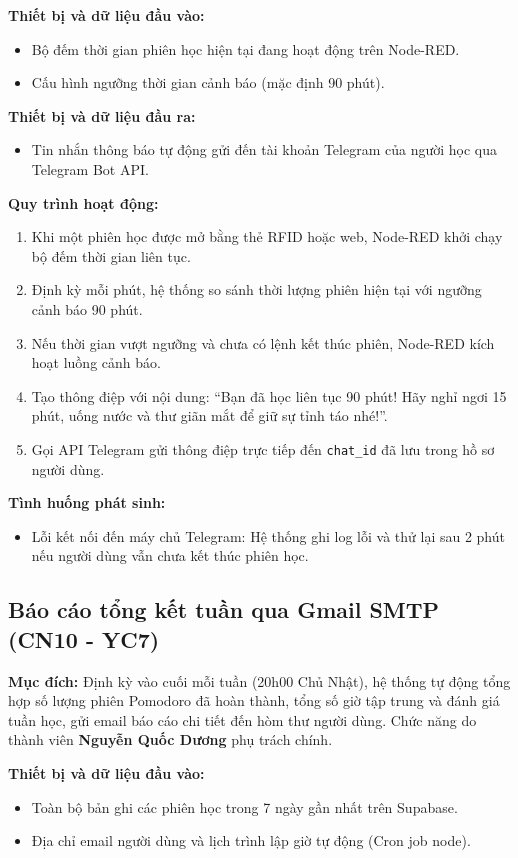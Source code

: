 \textbf{Thiết bị và dữ liệu đầu vào:}
\begin{itemize}
    \item Bộ đếm thời gian phiên học hiện tại đang hoạt động trên Node-RED.
    \item Cấu hình ngưỡng thời gian cảnh báo (mặc định 90 phút).
\end{itemize}

\textbf{Thiết bị và dữ liệu đầu ra:}
\begin{itemize}
    \item Tin nhắn thông báo tự động gửi đến tài khoản Telegram của người học qua Telegram Bot API.
\end{itemize}

\textbf{Quy trình hoạt động:}
\begin{enumerate}
    \item Khi một phiên học được mở bằng thẻ RFID hoặc web, Node-RED khởi chạy bộ đếm thời gian liên tục.
    \item Định kỳ mỗi phút, hệ thống so sánh thời lượng phiên hiện tại với ngưỡng cảnh báo 90 phút.
    \item Nếu thời gian vượt ngưỡng và chưa có lệnh kết thúc phiên, Node-RED kích hoạt luồng cảnh báo.
    \item Tạo thông điệp với nội dung: ``Bạn đã học liên tục 90 phút! Hãy nghỉ ngơi 15 phút, uống nước và thư giãn mắt để giữ sự tỉnh táo nhé!''.
    \item Gọi API Telegram gửi thông điệp trực tiếp đến \texttt{chat\_id} đã lưu trong hồ sơ người dùng.
\end{enumerate}

\textbf{Tình huống phát sinh:}
\begin{itemize}
    \item Lỗi kết nối đến máy chủ Telegram: Hệ thống ghi log lỗi và thử lại sau 2 phút nếu người dùng vẫn chưa kết thúc phiên học.
\end{itemize}

\subsection{Báo cáo tổng kết tuần qua Gmail SMTP (CN10 - YC7)}
\textbf{Mục đích:}
Định kỳ vào cuối mỗi tuần (20h00 Chủ Nhật), hệ thống tự động tổng hợp số lượng phiên Pomodoro đã hoàn thành, tổng số giờ tập trung và đánh giá tuần học, gửi email báo cáo chi tiết đến hòm thư người dùng. Chức năng do thành viên \textbf{Nguyễn Quốc Dương} phụ trách chính.

\textbf{Thiết bị và dữ liệu đầu vào:}
\begin{itemize}
    \item Toàn bộ bản ghi các phiên học trong 7 ngày gần nhất trên Supabase.
    \item Địa chỉ email người dùng và lịch trình lập giờ tự động (Cron job node).
\end{itemize}

